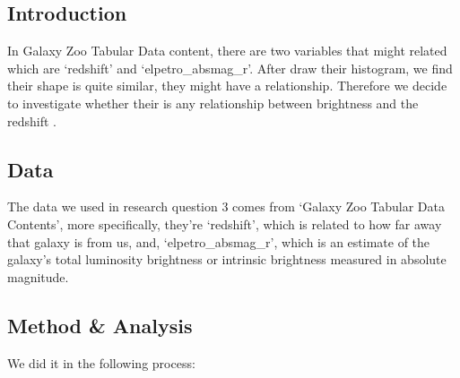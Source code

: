 \documentclass[12pt]{article}
\begin{document}
\subsection{Introduction}

In Galaxy Zoo Tabular Data content, there are two variables that might related which are `redshift' and `elpetro\_absmag\_r'. After draw their histogram, we find their shape is quite similar, they might have a relationship. Therefore we decide to investigate whether their is any relationship between brightness and the redshift .

\subsection{Data}
The data we used in research question 3 comes from `Galaxy Zoo Tabular Data Contents', more specifically, they're `redshift'\cite{redshift}, which is related to how far away that galaxy is from us, and, `elpetro\_absmag\_r', which is an estimate of the galaxy's total luminosity brightness or intrinsic brightness measured in absolute magnitude\cite{ab}.

\subsection{Method \& Analysis}

We did it in the following process:
\end{document}
